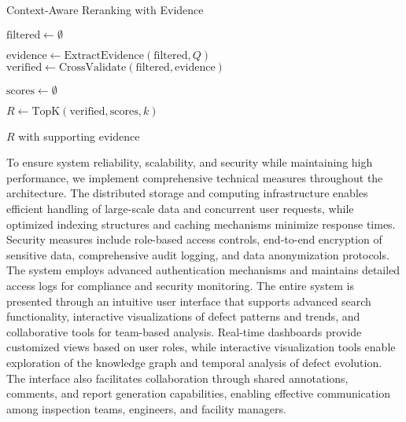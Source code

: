 \documentclass[a4paper,fleqn]{cas-sc}
\begin{document}
\begin{algorithm}[hbt!]
\caption{Context-Aware Reranking with Evidence}\label{alg:rerank}

$\text{filtered} \gets \emptyset$\;

$\text{evidence} \gets \text{ExtractEvidence}(\text{filtered}, Q)$\;
$\text{verified} \gets \text{CrossValidate}(\text{filtered}, \text{evidence})$\;

$\text{scores} \gets \emptyset$\;

$R \gets \text{TopK}(\text{verified}, \text{scores}, k)$\;

\Return $R$ with supporting evidence
\end{algorithm}


To ensure system reliability, scalability, and security while maintaining high performance, we implement comprehensive technical measures throughout the architecture. The distributed storage and computing infrastructure enables efficient handling of large-scale data and concurrent user requests, while optimized indexing structures and caching mechanisms minimize response times. Security measures include role-based access controls, end-to-end encryption of sensitive data, comprehensive audit logging, and data anonymization protocols. The system employs advanced authentication mechanisms and maintains detailed access logs for compliance and security monitoring. The entire system is presented through an intuitive user interface that supports advanced search functionality, interactive visualizations of defect patterns and trends, and collaborative tools for team-based analysis. Real-time dashboards provide customized views based on user roles, while interactive visualization tools enable exploration of the knowledge graph and temporal analysis of defect evolution. The interface also facilitates collaboration through shared annotations, comments, and report generation capabilities, enabling effective communication among inspection teams, engineers, and facility managers.
\end{document}
